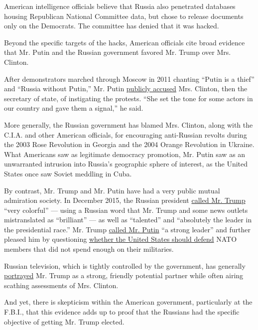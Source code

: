 American intelligence officials believe that Russia also penetrated
databases housing Republican National Committee data, but chose to
release documents only on the Democrats. The committee has denied that
it was hacked.

Beyond the specific targets of the hacks, American officials cite broad
evidence that Mr. Putin and the Russian government favored Mr. Trump
over Mrs. Clinton.

After demonstrators marched through Moscow in 2011 chanting ``Putin is a
thief'' and ``Russia without Putin,'' Mr. Putin
\href{http://www.nytimes.com/2011/12/09/world/europe/putin-accuses-clinton-of-instigating-russian-protests.html}{publicly
accused} Mrs. Clinton, then the secretary of state, of instigating the
protests. ``She set the tone for some actors in our country and gave
them a signal,'' he said.

More generally, the Russian government has blamed Mrs. Clinton, along
with the C.I.A. and other American officials, for encouraging
anti-Russian revolts during the 2003 Rose Revolution in Georgia and the
2004 Orange Revolution in Ukraine. What Americans saw as legitimate
democracy promotion, Mr. Putin saw as an unwarranted intrusion into
Russia's geographic sphere of interest, as the United States once saw
Soviet meddling in Cuba.

By contrast, Mr. Trump and Mr. Putin have had a very public mutual
admiration society. In December 2015, the Russian president
\href{http://abcnews.go.com/International/russian-president-vladimir-putin-praises-donald-trump-talented/story?id=35816611}{called
Mr. Trump} ``very colorful'' --- using a Russian word that Mr. Trump and
some news outlets mistranslated as ``brilliant'' --- as well as
``talented'' and ``absolutely the leader in the presidential race.'' Mr.
Trump
\href{http://www.nbcnews.com/meet-the-press/meet-press-december-20-2015-n483421}{called
Mr. Putin} ``a strong leader'' and further pleased him by questioning
\href{http://www.nytimes.com/2016/07/21/us/politics/donald-trump-issues.html}{whether
the United States should defend} NATO members that did not spend enough
on their militaries.

Russian television, which is tightly controlled by the government, has
generally
\href{http://www.cnbc.com/2016/11/05/russian-media-backs-trump-questions-us-democracy.html}{portrayed}
Mr. Trump as a strong, friendly potential partner while often airing
scathing assessments of Mrs. Clinton.

And yet, there is skepticism within the American government,
particularly at the F.B.I., that this evidence adds up to proof that the
Russians had the specific objective of getting Mr. Trump elected.

